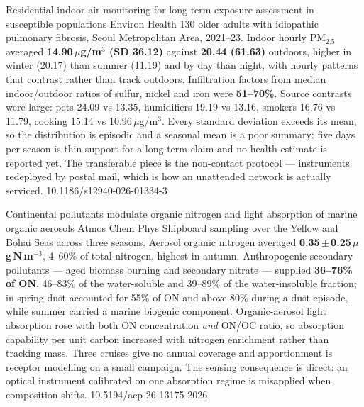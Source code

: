 \documentclass[10pt]{article}
\begin{document}
\clearpage


{Residential indoor air monitoring for long-term exposure assessment in susceptible
populations}
{Environ Health}
{130 older adults with idiopathic pulmonary fibrosis, Seoul Metropolitan Area, 2021--23.
Indoor hourly PM$_{2.5}$ averaged \textbf{14.90\,$\mu$g/m$^3$ (SD 36.12)} against
\textbf{20.44 (61.63)} outdoors, higher in winter (20.17) than summer (11.19) and by day
than night, with hourly patterns that contrast rather than track outdoors. Infiltration
factors from median indoor/outdoor ratios of sulfur, nickel and iron were
\textbf{51--70\%}. Source contrasts were large: pets 24.09 vs 13.35, humidifiers 19.19 vs
13.16, smokers 16.76 vs 11.79, cooking 15.14 vs 10.96\,$\mu$g/m$^3$. Every standard
deviation exceeds its mean, so the distribution is episodic and a seasonal mean is a poor
summary; five days per season is thin support for a long-term claim and no health estimate
is reported yet. The transferable piece is the non-contact protocol --- instruments
redeployed by postal mail, which is how an unattended network is actually serviced.}
{10.1186/s12940-026-01334-3}

{Continental pollutants modulate organic nitrogen and light absorption of marine organic
aerosols}
{Atmos Chem Phys}
{Shipboard sampling over the Yellow and Bohai Seas across three seasons. Aerosol organic
nitrogen averaged \textbf{0.35\,$\pm$\,0.25\,$\mu$g\,N\,m$^{-3}$}, 4--60\% of total
nitrogen, highest in autumn. Anthropogenic secondary pollutants --- aged biomass burning
and secondary nitrate --- supplied \textbf{36--76\% of ON}, 46--83\% of the water-soluble
and 39--89\% of the water-insoluble fraction; in spring dust accounted for 55\% of ON and
above 80\% during a dust episode, while summer carried a marine biogenic component.
Organic-aerosol light absorption rose with both ON concentration \emph{and} ON/OC ratio,
so absorption capability per unit carbon increased with nitrogen enrichment rather than
tracking mass. Three cruises give no annual coverage and apportionment is receptor
modelling on a small campaign. The sensing consequence is direct: an optical instrument
calibrated on one absorption regime is misapplied when composition shifts.}
{10.5194/acp-26-13175-2026}
\end{document}

